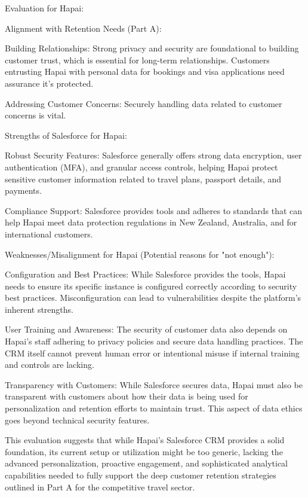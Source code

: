 \documentclass{article}
\begin{document}
Evaluation for Hapai:

Alignment with Retention Needs (Part A):

Building Relationships: Strong privacy and security are foundational to building customer trust, which is essential for long-term relationships. Customers entrusting Hapai with personal data for bookings and visa applications need assurance it's protected.

Addressing Customer Concerns: Securely handling data related to customer concerns is vital.

Strengths of Salesforce for Hapai:

Robust Security Features: Salesforce generally offers strong data encryption, user authentication (MFA), and granular access controls, helping Hapai protect sensitive customer information related to travel plans, passport details, and payments.

Compliance Support: Salesforce provides tools and adheres to standards that can help Hapai meet data protection regulations in New Zealand, Australia, and for international customers.

Weaknesses/Misalignment for Hapai (Potential reasons for "not enough"):

Configuration and Best Practices: While Salesforce provides the tools, Hapai needs to ensure its specific instance is configured correctly according to security best practices. Misconfiguration can lead to vulnerabilities despite the platform's inherent strengths.

User Training and Awareness: The security of customer data also depends on Hapai’s staff adhering to privacy policies and secure data handling practices. The CRM itself cannot prevent human error or intentional misuse if internal training and controls are lacking.

Transparency with Customers: While Salesforce secures data, Hapai must also be transparent with customers about how their data is being used for personalization and retention efforts to maintain trust. This aspect of data ethics goes beyond technical security features.

This evaluation suggests that while Hapai's Salesforce CRM provides a solid foundation, its current setup or utilization might be too generic, lacking the advanced personalization, proactive engagement, and sophisticated analytical capabilities needed to fully support the deep customer retention strategies outlined in Part A for the competitive travel sector.
\end{document}
